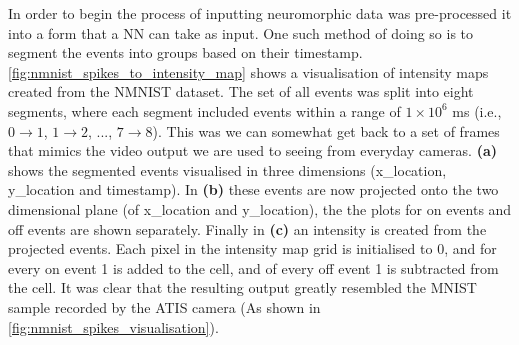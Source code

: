In order to begin the process of inputting neuromorphic data was pre-processed it into a form that a NN can take as input. One such method of doing so is to segment the events into groups based on their timestamp. \autoref{fig:nmnist_spikes_to_intensity_map} shows a visualisation of intensity maps created from the NMNIST\cite{NMNIST} dataset. The set of all events was split into eight segments, where each segment included events within a range of $ 1 \times 10^6 $ ms (i.e., $ 0 \rightarrow 1 $, $ 1 \rightarrow 2 $, ..., $ 7 \rightarrow 8 $). This was we can somewhat get back to a set of frames that mimics the video output we are used to seeing from everyday cameras. \textbf{(a)} shows the segmented events visualised in three dimensions (x\_location, y\_location and timestamp). In \textbf{(b)} these events are now projected onto the two dimensional plane (of x\_location and y\_location), the the plots for on events and off events are shown separately. Finally in \textbf{(c)} an intensity is created from the projected events. Each pixel in the intensity map grid is initialised to 0, and for every on event 1 is added to the cell, and of every off event 1 is subtracted from the cell. It was clear that the resulting output greatly resembled the MNIST\cite{MNIST} sample recorded by the ATIS camera (As shown in \autoref{fig:nmnist_spikes_visualisation}).

